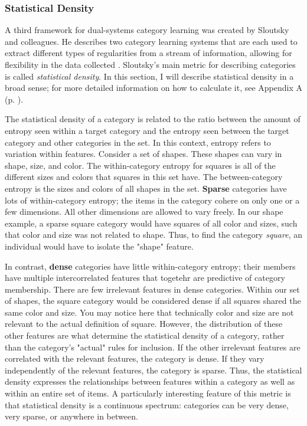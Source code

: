 \documentclass[../dissertation.tex]{subfiles}
\begin{document}
\subsubsection{Statistical Density}
A third framework for dual-systems category learning was created by Sloutsky and colleagues. He describes two category learning systems that are each used to extract different types of regularities from a stream of information, allowing for flexibility in the data collected \citep{Sloutsky2010}. Sloutsky's main metric for describing categories is called \textit{statistical density}. In this section, I will describe statistical density in a broad sense; for more detailed information on how to calculate it, see Appendix A (p. \pageref{appendixA}). \par
	The statistical density of a category is related to the ratio between the amount of entropy seen within a target category and the entropy seen between the target category and other categories in the set. In this context, entropy refers to variation within features. Consider a set of shapes. These shapes can vary in shape, size, and color. The within-category entropy for squares is all of the different sizes and colors that squares in this set have. The between-category entropy is the sizes and colors of all shapes in the set. \textbf{Sparse} categories have lots of within-category entropy; the items in the category cohere on only one or a few dimensions. All other dimensions are allowed to vary freely. In our shape example, a sparse square category would have squares of all color and sizes, such that color and size was not related to shape. Thus, to find the category \textit{square}, an individual would have to isolate the "shape" feature. \par
	In contrast, \textbf{dense} categories have little within-category entropy; their members have multiple intercorrelated features that togetehr are predictive of category membership. There are few irrelevant features in dense categories. Within our set of shapes, the square category would be considered dense if all squares shared the same color and size. You may notice here that technically color and size are not relevant to the actual definition of square. However, the distribution of these other features are what determine the statistical density of a category, rather than the category's "actual" rules for inclusion. If the other irrelevant features are correlated with the relevant features, the category is dense. If they vary independently of the relevant features, the category is sparse. Thus, the statistical density expresses the relationships between features within a category as well as within an entire set of items. A particularly interesting feature of this metric is that statistical density is a continuous spectrum: categories can be very dense, very sparse, or anywhere in between. \par 
\end{document}
